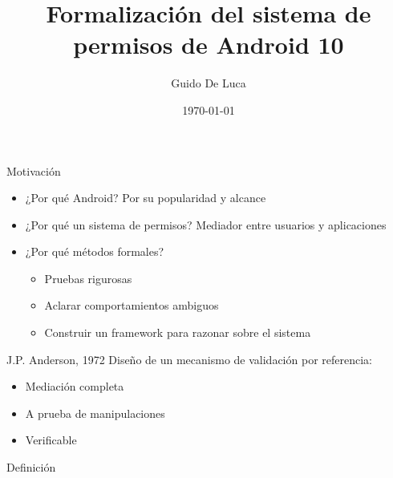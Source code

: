 \documentclass[pdf, handout]{beamer} %
\title{Formalización del sistema de permisos de Android 10}
\author[Universidad Nacional de Rosario]{Guido De Luca}
\institute{Universidad Nacional de Rosario}
\date{\today}
\begin{document}


\begin{frame}[plain]
    \titlepage
\end{frame}

\begin{frame}{Motivación}
    \begin{itemize}
        \item ¿Por qué Android? \pause Por su popularidad y alcance \pause
        \item ¿Por qué un sistema de permisos? \pause Mediador entre usuarios y aplicaciones \pause
        \item ¿Por qué métodos formales? \pause
              \begin{itemize}[<+->]
                  \item Pruebas rigurosas
                  \item Aclarar comportamientos ambiguos
                  \item Construir un framework para razonar sobre el sistema
              \end{itemize}
    \end{itemize}
\end{frame}

\begin{frame}{J.P. Anderson, 1972}
    Diseño de un mecanismo de validación por referencia:
    \pause
    \begin{itemize}[<+->]
        \item Mediación completa
        \item A prueba de manipulaciones
        \item Verificable
    \end{itemize}

    \begin{block}{Definición}


    \end{block}
\end{frame}
\end{document}
